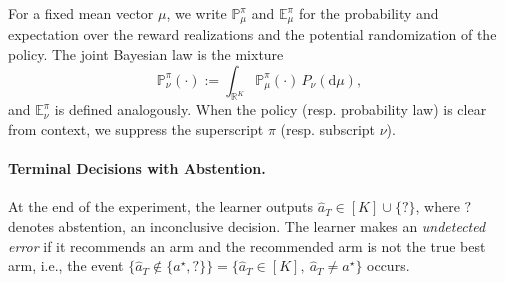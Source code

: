 \documentclass[10pt]{article}
\newcommand{\dd}{\mathrm{d}}
\theoremstyle{plain}
\begin{document}


For a fixed mean vector $\mu$, we write $\mathbb P_\mu^\pi$ and
$\mathbb E_\mu^\pi$ for the probability and expectation over the reward
realizations and the potential randomization of the policy. The joint Bayesian law is the
mixture
\[
    \mathbb P_\nu^\pi(\cdot)
    :=
    \int_{\mathbb R^K}
    \mathbb P_\mu^\pi(\cdot)\,P_\nu(\dd\mu),
\]
and $\mathbb E_\nu^\pi$ is defined analogously. When the policy (resp. probability law) is clear from context, we suppress the superscript $\pi$ (resp. subscript $\nu$).


\paragraph{Terminal Decisions with Abstention.}

At the end of the experiment, the learner outputs $\hat a_T\in[K]\cup\{?\}$,
where $?$ denotes abstention, an inconclusive decision. The learner makes an
\emph{undetected error} if it recommends an arm and the recommended arm is not 
the true best arm, i.e., the event
    $\big\{\hat a_T\notin\{a^\star,?\} \big\}
    =
     \big\{\hat a_T\in[K],\ \hat a_T\neq a^\star\big\}$ occurs.
\end{document}

